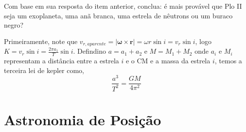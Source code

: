 \documentclass[11pt]{article}
\begin{document}
\begin{pproblem}
\begin{alternativas}
        \item Com base em sua resposta do item anterior, conclua: é mais provável que Plo II seja um exoplaneta, uma anã branca, uma estrela de nêutrons ou um buraco negro?
    \end{alternativas}
    \begin{pssolution*}{}{}
        \begin{alternativas}
            \item Primeiramente, note que \(v_{r, aparente} = |\mathbf{\omega}\times\mathbf{r}| = \omega r \sin i = v_r \sin i\), logo \(K = v_r\sin i = \frac{2\pi a_1}{T}\sin i\). Defindino \(a=a_1+a_2\) e \(M = M_1+M_2\) onde \(a_i\) e \(M_i\) representam a distância entre a estrela \(i\) e o CM e a massa da estrela \(i\), temos a terceira lei de kepler como, 
            \[\frac{a^3}{T^2} = \frac{GM}{4\pi^2}\]
        \end{alternativas}
    \end{pssolution*}
    
    
\end{pproblem}

\newpage

\section{Astronomia de Posição}
\end{document}

